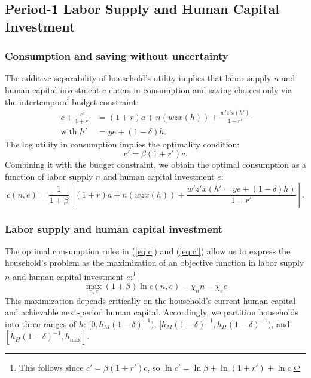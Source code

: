\documentclass[12pt]{article}
\begin{document}
\subsection{Period-1 Labor Supply and Human Capital Investment} 
\subsubsection{Consumption and saving without uncertainty}

The additive separability of household's utility implies that labor supply $n$ and human capital investment $e$ enters in consumption and saving choices only via the intertemporal budget constraint:
\begin{align*}
    c + \frac{c'}{1+r'}&=(1+r)a+n(wzx(h))+\frac{w'z'x(h')}{1+r'} \\
    \text{with } h'&=ye+ (1-\delta)h.
\end{align*}
The log utility in consumption implies the optimality condition:
\begin{equation}\label{eq:c'}
     c'=\beta(1+r')c.
\end{equation}
Combining it with the budget constraint, we obtain the optimal consumption as a function of labor supply $n$ and human capital investment $e$:
\begin{equation}\label{eq:c}
    c(n,e)=\frac{1}{1+\beta}\left[(1+r)a+n(wzx(h))+\frac{w'z'x\left(h'=ye+ (1-\delta)h\right)}{1+r'} \right].
\end{equation}

\subsubsection{Labor supply and human capital investment}\label{sec:n_and_e}

The optimal consumption rules in (\ref{eq:c}) and (\ref{eq:c'}) allow us to express the household’s problem as the maximization of an objective function in labor supply $n$ and human capital investment $e$:\footnote{This follows since $c' = \beta(1+r')c$, so $\ln c' = \ln\beta + \ln(1+r') + \ln c$.} 
\begin{equation}
   \max_{n,e} (1+\beta)\ln c(n,e) - \chi_n n - \chi_e e
\end{equation}
This maximization depends critically on the household's current human capital and achievable next-period human capital. Accordingly, we partition households into three ranges of $h$: $[0,h_M(1-\delta)^{-1})$, $[h_M(1-\delta)^{-1},h_H(1-\delta)^{-1})$, and $[h_H(1-\delta)^{-1},h_{\max}]$. 
\end{document}
